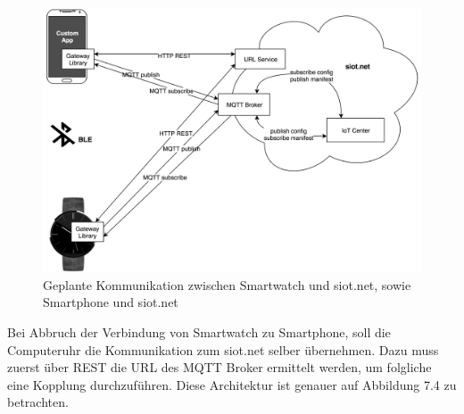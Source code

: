 \begin{figure}[h]
  \centering
  \includegraphics[scale=0.15]{98_Bilder/07_Architektur/02_Architektur}
  \caption[Geplante Netzwerk-Architektur ohne BLE/mit WLAN]{Geplante Kommunikation zwischen Smartwatch und siot.net, sowie Smartphone und siot.net}
\end{figure}
Bei Abbruch der Verbindung von Smartwatch zu Smartphone, soll die Computeruhr die Kommunikation zum siot.net selber übernehmen. Dazu muss zuerst über REST die URL des MQTT Broker ermittelt werden, um folgliche eine Kopplung durchzuführen. Diese Architektur ist genauer auf Abbildung 7.4 zu betrachten.

\newpage
